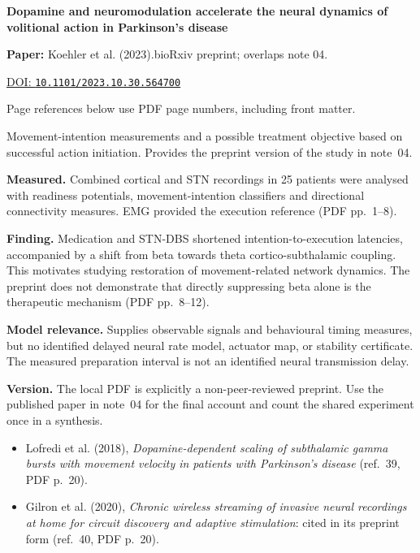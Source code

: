 

{\Large\bfseries Dopamine and neuromodulation accelerate the neural dynamics of volitional action in Parkinson's disease\par}

\textbf{Paper:} Koehler et al. (2023).\quad bioRxiv preprint; overlaps note 04.\par
\href{https://doi.org/10.1101/2023.10.30.564700}{DOI: \nolinkurl{10.1101/2023.10.30.564700}}\par
{\footnotesize Page references below use PDF page numbers, including front matter.}

Movement-intention measurements and a possible treatment objective based on successful action initiation. Provides the preprint version of the study in note~04.

\textbf{Measured.} Combined cortical and STN recordings in 25 patients were analysed with readiness potentials, movement-intention classifiers and directional connectivity measures. EMG provided the execution reference (PDF pp.~1--8).

\textbf{Finding.} Medication and STN-DBS shortened intention-to-execution latencies, accompanied by a shift from beta towards theta cortico-subthalamic coupling. This motivates studying restoration of movement-related network dynamics. The preprint does not demonstrate that directly suppressing beta alone is the therapeutic mechanism (PDF pp.~8--12).

\textbf{Model relevance.} Supplies observable signals and behavioural timing measures, but no identified delayed neural rate model, actuator map, or stability certificate. The measured preparation interval is not an identified neural transmission delay.

\textbf{Version.} The local PDF is explicitly a non-peer-reviewed preprint. Use the published paper in note~04 for the final account and count the shared experiment once in a synthesis.

\begin{itemize}
\item Lofredi et al. (2018), \emph{Dopamine-dependent scaling of subthalamic gamma bursts with movement velocity in patients with Parkinson's disease} (ref.~39, PDF p.~20).
\item Gilron et al. (2020), \emph{Chronic wireless streaming of invasive neural recordings at home for circuit discovery and adaptive stimulation}: cited in its preprint form (ref.~40, PDF p.~20).
\end{itemize}



